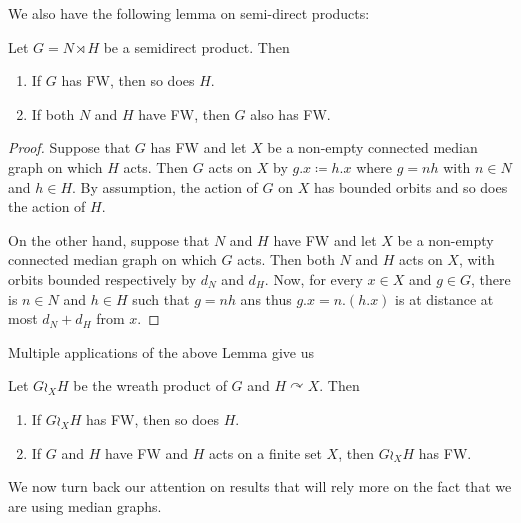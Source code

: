 We also have the following lemma on semi-direct products:
\begin{lem}\label{Lemma:Semidirect}
Let $G=N\rtimes H$ be a semidirect product. Then
\begin{enumerate}
\item
If $G$ has FW, then so does $H$.
\item
If both $N$ and $H$ have FW, then $G$ also has FW.
\end{enumerate}
\end{lem}
\begin{proof}
Suppose that $G$ has FW and let $X$ be a non-empty connected median graph on which $H$ acts.
Then $G$ acts on $X$ by $g.x\coloneqq h.x$ where $g=nh$ with $n\in N$ and $h\in H$.
By assumption, the action of $G$ on $X$ has bounded orbits and so does the action of $H$.

On the other hand, suppose that $N$ and $H$ have FW and let $X$ be a non-empty connected median graph on which $G$ acts.
Then both $N$ and $H$ acts on $X$, with orbits bounded respectively by $d_N$ and $d_H$.
Now, for every $x\in X$ and $g\in G$, there is $n\in N$ and $h\in H$ such that $g=nh$ ans thus $g.x=n.(h.x)$ is at distance at most $d_N+d_H$ from $x$.
\end{proof}
Multiple applications of the above Lemma give us
\begin{cor}\label{Cor:Wreath}
Let $G\wr_X H$ be the wreath product of $G$ and $H\curvearrowright X$.
Then
\begin{enumerate}
\item
If $G\wr_X H$ has FW, then so does $H$.
\item
If $G$ and $H$ have FW and $H$ acts on a finite set $X$, then $G\wr_X H$ has FW.
\end{enumerate}
\end{cor}







We now turn back our attention on results that will rely more on the fact that we are using median graphs.

